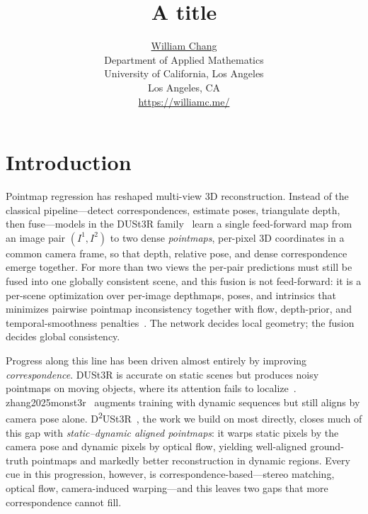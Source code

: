 \documentclass{article}
\title{A title}
\date{} 					%
\author{ \href{https://orcid.org/0000-0003-1700-756X}{William Chang} \\
	Department of Applied Mathematics\\
	University of California, Los Angeles\\
	Los Angeles, CA \\
	\url{https://williamc.me/} \\
	\And
}
\newcommand{\R}{\mathbb{R}}
\newcommand{\diag}{\operatorname{diag}}
\newcommand{\SE}{\mathrm{SE}}          %
\DeclareMathOperator{\vol}{vol}        %
\begin{document}
\maketitle
\begin{abstract}
    
\end{abstract}

%

\section{Introduction}

Pointmap regression has reshaped multi-view 3D reconstruction. Instead of the
classical pipeline---detect correspondences, estimate poses, triangulate
depth, then fuse---models in the DUSt3R family~\cite{wang2024dust3r} learn a single
feed-forward map from an image pair $(I^1,I^2)$ to two dense \emph{pointmaps},
per-pixel 3D coordinates in a common camera frame, so that depth, relative
pose, and dense correspondence emerge together. For more than two views the
per-pair predictions must still be fused into one globally consistent scene,
and this fusion is not feed-forward: it is a per-scene optimization over
per-image depthmaps, poses, and intrinsics that minimizes pairwise pointmap
inconsistency together with flow, depth-prior, and temporal-smoothness
penalties~\cite{wang2024dust3r,zhang2025monst3r}. The network decides local geometry; the
fusion decides global consistency.

Progress along this line has been driven almost entirely by improving
\emph{correspondence}. DUSt3R is accurate on static scenes but produces noisy
pointmaps on moving objects, where its attention fails to
localize~\cite{wang2024dust3r}. zhang2025monst3r~\cite{zhang2025monst3r} augments training with dynamic
sequences but still aligns by camera pose alone. D\textsuperscript{2}USt3R~\cite{han2026enhancing},
the work we build on most directly, closes much of this gap with
\emph{static--dynamic aligned pointmaps}: it warps static pixels by the camera
pose and dynamic pixels by optical flow, yielding well-aligned ground-truth
pointmaps and markedly better reconstruction in dynamic regions. Every cue in
this progression, however, is correspondence-based---stereo matching, optical
flow, camera-induced warping---and this leaves two gaps that more
correspondence cannot fill.
\end{document}
